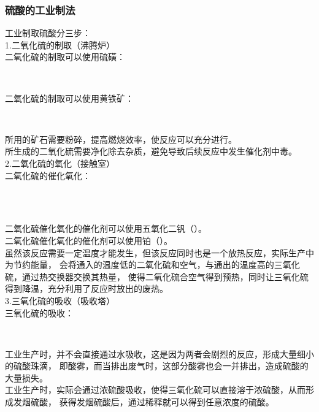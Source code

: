 \documentclass[UTF8]{ctexart}
\begin{document}
\newpage

\subsubsection{硫酸的工业制法}
    工业制取硫酸分三步：\\[4mm]
    1.二氧化硫的制取（沸腾炉）\\[3mm]
    二氧化硫的制取可以使用硫磺：
    \begin{center}
        \\[6mm]
    \end{center}
    二氧化硫的制取可以使用黄铁矿：
    \begin{center}
        \\[6mm]
    \end{center}
    所用的矿石需要粉碎，提高燃烧效率，使反应可以充分进行。\\[3mm]
    所生成的二氧化硫需要净化除去杂质，避免导致后续反应中发生催化剂中毒。\\[6mm]
    2.二氧化硫的氧化（接触室）\\[3mm]
    二氧化硫的催化氧化：
    \begin{center}
        \\[3mm]
        \\[6mm]
    \end{center}
    二氧化硫催化氧化的催化剂可以使用五氧化二钒（）。\\[3mm]
    二氧化硫催化氧化的催化剂可以使用铂（）。\\[3mm]
    虽然该反应需要一定温度才能发生，但该反应同时也是一个放热反应，实际生产中为节约能量，
    会将通入的温度低的二氧化硫和空气，与通出的温度高的三氧化硫，通过热交换器交换其热量，
    使得二氧化硫合空气得到预热，同时让三氧化硫得到降温，充分利用了反应时放出的废热。\\[6mm]
    3.三氧化硫的吸收（吸收塔）\\[3mm]
    三氧化硫的吸收：
    \begin{center}
        \\[6mm]
    \end{center}
    工业生产时，并不会直接通过水吸收，这是因为两者会剧烈的反应，形成大量细小的硫酸珠滴，
    即酸雾，而当排出废气时，这部分酸雾也会一并排出，造成硫酸的大量损失。\\[3mm]
    工业生产时，实际会通过浓硫酸吸收，使得三氧化硫可以直接溶于浓硫酸，从而形成发烟硫酸，
    获得发烟硫酸后，通过稀释就可以得到任意浓度的硫酸。
\end{document}
